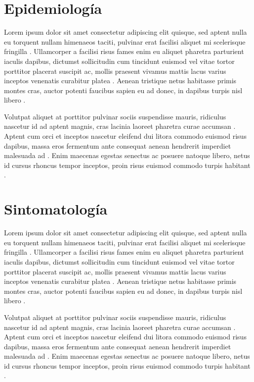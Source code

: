 \documentclass{article}
\begin{document}
\section {Epidemiología}

Lorem ipsum dolor sit amet consectetur adipiscing elit quisque, sed aptent nulla eu torquent nullam himenaeos taciti, pulvinar erat facilisi aliquet mi scelerisque fringilla \cite{C}. Ullamcorper a facilisi risus fames enim eu aliquet pharetra parturient iaculis dapibus, dictumst sollicitudin cum tincidunt euismod vel vitae tortor porttitor placerat suscipit ac, mollis praesent vivamus mattis lacus varius inceptos venenatis curabitur platea \cite{A}. Aenean tristique netus habitasse primis montes cras, auctor potenti faucibus sapien eu ad donec, in dapibus turpis nisl libero \cite{B}.

Volutpat aliquet at porttitor pulvinar sociis suspendisse mauris, ridiculus nascetur id ad aptent magnis, cras lacinia laoreet pharetra curae accumsan \cite{A}. Aptent cum orci et inceptos nascetur eleifend dui litora commodo euismod risus dapibus, massa eros fermentum ante consequat aenean hendrerit imperdiet malesuada ad \cite{B}. Enim maecenas egestas senectus ac posuere natoque libero, netus id cursus rhoncus tempor inceptos, proin risus euismod commodo turpis habitant \cite{C}.

\section {Sintomatología}

Lorem ipsum dolor sit amet consectetur adipiscing elit quisque, sed aptent nulla eu torquent nullam himenaeos taciti, pulvinar erat facilisi aliquet mi scelerisque fringilla \cite{C}. Ullamcorper a facilisi risus fames enim eu aliquet pharetra parturient iaculis dapibus, dictumst sollicitudin cum tincidunt euismod vel vitae tortor porttitor placerat suscipit ac, mollis praesent vivamus mattis lacus varius inceptos venenatis curabitur platea \cite{A}. Aenean tristique netus habitasse primis montes cras, auctor potenti faucibus sapien eu ad donec, in dapibus turpis nisl libero \cite{B}.

Volutpat aliquet at porttitor pulvinar sociis suspendisse mauris, ridiculus nascetur id ad aptent magnis, cras lacinia laoreet pharetra curae accumsan \cite{A}. Aptent cum orci et inceptos nascetur eleifend dui litora commodo euismod risus dapibus, massa eros fermentum ante consequat aenean hendrerit imperdiet malesuada ad \cite{B}. Enim maecenas egestas senectus ac posuere natoque libero, netus id cursus rhoncus tempor inceptos, proin risus euismod commodo turpis habitant \cite{C}.
\end{document}
